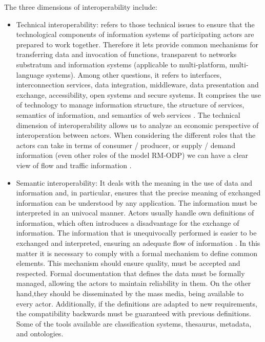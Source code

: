 \documentclass[10pt,twocolumn,ieeetran]{article}
\begin{document}
The three dimensions of interoperability include:

\begin{itemize}

\item Technical interoperability: refers to those technical issues to ensure that the technological components of information systems of participating actors are prepared to work together. Therefore  it lets provide common mechanisms for transferring data and invocation of functions, transparent to networks substratum and information systems (applicable to multi-platform, multi-language systems). Among other questions, it refers to interfaces, interconnection services, data integration, middleware, data presentation and exchange, accessibility, open systems and secure systems. It  comprises the use of technology to manage information structure, the structure of services, semantics of information, and semantics of web services \cite{Moreno}. The technical dimension of interoperability allows us to analyze an economic perspective of  interoperation between actors. When considering the different roles that the actors can take in terms of consumer / producer, or supply / demand information (even other roles of the model RM-ODP) we can have a clear view of flow and traffic information .

\item Semantic interoperability: It deals with the meaning in the use of data and information and, in particular, ensures that the precise meaning of exchanged information can be understood by any application. The information must be interpreted in an univocal manner. Actors usually handle own definitions of information, which often introduces a disadvantage for the exchange of information. The information that is unequivocally performed is easier to be exchanged and interpreted, ensuring an adequate flow of information \cite{Moreno}.
In this matter it is necessary to comply with a formal mechanism to define common elements. This mechanism should ensure quality, must be accepted and respected. Formal documentation that defines the data  must  be formally managed, allowing  the actors to maintain reliability in them.  On the other hand,they should be disseminated by the mass media, being  available to every actor. Additionally, if the definitions are adapted to new requirements,  the compatibility backwards must be guaranteed  with previous definitions. Some of the tools available are classification systems, thesaurus, metadata, and ontologies. 


\end{itemize}
\end{document}
